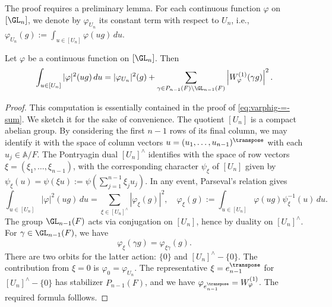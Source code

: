 The proof requires a preliminary lemma.  For each continuous function $\varphi$ on $[\GL_n]$, we denote by $\varphi_{U_n}$ its constant term with respect to $U_n$, i.e., $\varphi_{U_n}(g) := \int_{u \in [U_n]} \varphi(u g) \, d u$.
\begin{lemma}\label{lem:sub-gln:let-varphi-be-parseval-U-n}
  Let $\varphi$ be a continuous function on $[\GL_n]$.  Then
  \begin{equation*}
    \int_{u \in [U_n]} |\varphi|^2( u g) \, d u
    =
    |\varphi_{U_n}|^2(g)
    +
    \sum_{\gamma \in P_{n-1}(F) \backslash \GL_{n-1}(F)}
    \left\lvert
      W_{\varphi}^{(1)}(\gamma g)
    \right\rvert^2.
  \end{equation*}
\end{lemma}
\begin{proof}
  This computation is essentially contained in the proof of \eqref{eq:varphig-=-sum}.  We sketch it for the sake of convenience.  The quotient $[U_n]$ is a compact abelian group.  By considering the first $n-1$ rows of its final column, we may identify it with the space of column vectors $u = (u_1,\dotsc,u_{n-1})^\transpose$ with each $u_j \in \mathbb{A}/F$.  The Pontryagin dual $[U_n]^\wedge$ identifies with the space of row vectors $\xi = (\xi_1,\dotsc,\xi_{n-1})$, with the corresponding character $\psi_\xi$ of $[U_n]$ given by $\psi_\xi(u) = \psi(\xi u) := \psi(\sum_{j=1}^{n-1} \xi_j u_j)$.  In any event, Parseval's relation gives
  \begin{equation*}
    \int_{u \in [U_n]} |\varphi|^2(u g) \, d u
    = \sum_{\xi \in [U_n]^\wedge }
    |\varphi_\xi(g)|^2,
    \quad
    \varphi_\xi(g)
    :=
    \int_{u \in [U_n]}
    \varphi(u g) \psi_\xi^{-1}(u) \, d u.
  \end{equation*}
  The group $\GL_{n-1}(F)$ acts via conjugation on $[U_n]$, hence by duality on $[U_n]^\wedge$.  For $\gamma \in \GL_{n-1}(F)$, we have
  \begin{equation*}
    \varphi_{\xi}(\gamma g) = \varphi_{\xi \gamma}(g).
  \end{equation*}
  There are two orbits for the latter action: $\{0\}$ and $[U_n]^\wedge - \{0\}$.  The contribution from $\xi = 0$ is $\varphi_0 = \varphi_{U_n}$.  The representative $\xi = e_{n-1}^\transpose$ for $[U_n]^\wedge - \{0\}$ has stabilizer $P_{n-1}(F)$, and we have $\varphi_{e_{n-1}^\transpose} = W_{\varphi}^{(1)}$.  The required formula folllows.
\end{proof}

